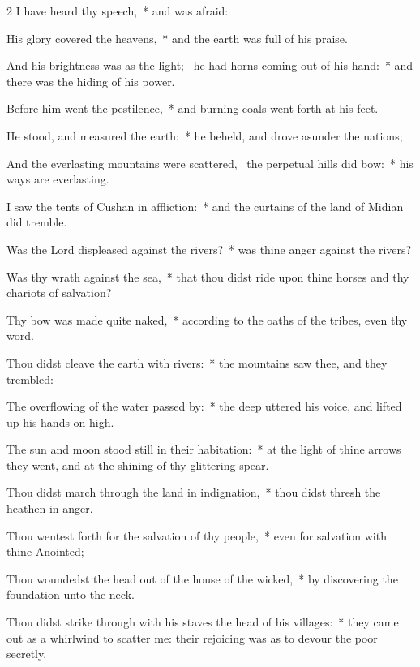 \begin{multicols}{2}
 I have heard thy speech,~* and was afraid:\par
{}
His glory covered the heavens,~* and the earth was full of his praise.\par
And his brightness was as the light;~{\dag} he had horns coming out of his hand:~* and there was the hiding of his power.\par
Before him went the pestilence,~* and burning coals went forth at his feet.\par
He stood, and measured the earth:~* he beheld, and drove asunder the nations;\par
And the everlasting mountains were scattered,~{\dag} the perpetual hills did bow:~* his ways are everlasting.\par
I saw the tents of Cushan in affliction:~* and the curtains of the land of Midian did tremble.\par
Was the Lord displeased against the rivers?~* was thine anger against the rivers?\par
Was thy wrath against the sea,~* that thou didst ride upon thine horses and thy chariots of salvation?\par
Thy bow was made quite naked,~* according to the oaths of the tribes, even thy word.\par
Thou didst cleave the earth with rivers:~* the mountains saw thee, and they trembled:\par
The overflowing of the water passed by:~* the deep uttered his voice, and lifted up his hands on high.\par
The sun and moon stood still in their habitation:~* at the light of thine arrows they went, and at the shining of thy glittering spear.\par
Thou didst march through the land in indignation,~* thou didst thresh the heathen in anger.\par
Thou wentest forth for the salvation of thy people,~* even for salvation with thine Anointed;\par
Thou woundedst the head out of the house of the wicked,~* by discovering the foundation unto the neck.\par
Thou didst strike through with his staves the head of his villages:~* they came out as a whirlwind to scatter me: their rejoicing was as to devour the poor secretly.\par

\end{multicols}
